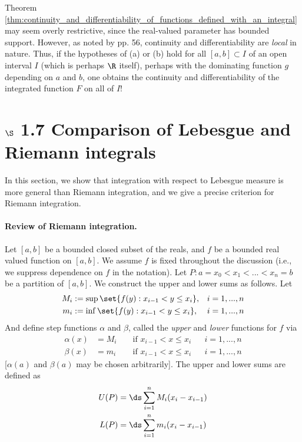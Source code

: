 \documentclass{article} %
\begin{document}
\begin{remark}{}
Theorem \ref{thm:continuity_and_differentiability_of_functions_defined_with_an_integral}  may seem overly restrictive, since the real-valued parameter has bounded support.  However, as noted by \cite{folland1999real} pp. 56, continuity and differentiability are \textit{local} in nature.  Thus, if the hypotheses of (a) or (b) hold for all $[a,b] \subset I$ of an open interval $I$ (which is perhaps $\R$ itself), perhaps with the dominating function $g$ depending on $a$ and $b$, one obtains the continuity and differentiability of the integrated function $F$ on all of $I$! 	
\end{remark}


\section{$\S$ 1.7 Comparison of Lebesgue and Riemann integrals}

In this section, we show that integration with respect to Lebesgue measure is more general than Riemann integration, and we give a precise criterion for Riemann integration.

\paragraph{Review of Riemann integration.} Let $[a,b]$ be a bounded closed subset of the reals, and $f$ be a bounded real valued function on $[a,b]$. We assume $f$ is fixed throughout the discussion (i.e., we suppress dependence on $f$ in the notation).  Let $P: a=x_0 < x_1 < ... < x_n =b$ be a partition of $[a,b]$.  We construct the upper and lower sums as follows.  Let 
\begin{align*}
M_i &:= \sup \set{f(y) : x_{i-1} < y \leq x_i}, && i=1,...,n \\	
m_i &:= \inf \set{f(y) : x_{i-1} < y \leq x_i}, && i=1,...,n 
\end{align*}
And define step functions $\alpha$ and $\beta$, called the \textit{upper} and \textit{lower} functions for $f$ via 
\begin{align*}
\alpha(x) &= M_i && \text{ if } x_{i-1} < x \leq x_{i}   && i=1,...,n \\	
\beta(x) &= m_i && \text{ if } x_{i-1} < x \leq x_{i}  && i=1,...,n 	
\end{align*}
[$\alpha(a)$ and $\beta(a)$ may be chosen arbitrarily].   The upper and lower sums are defined as
\begin{subequations}
\begin{align}
U(P) &= \ds\sum_{i=1}^n M_i (x_i - x_{i-1}) \\	
L(P) &= \ds\sum_{i=1}^n m_i (x_i - x_{i-1}) 
\end{align}
\label{eqn:upper_and_lower_sums}	
\end{subequations}
\end{document}
